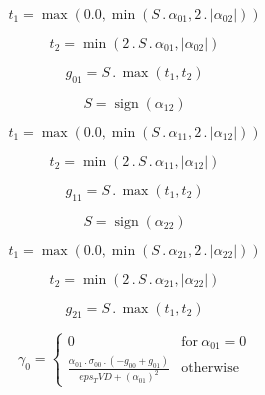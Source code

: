 \documentclass{article}
\begin{document}
\begin{dmath}t_{1} = \max\left(0.0, \min\left(S \,.\, \alpha_{01}, 2 \,.\, \left|{\alpha_{02}}\right|\right)\right)\end{dmath}

\begin{dmath}t_{2} = \min\left(2 \,.\, S \,.\, \alpha_{01}, \left|{\alpha_{02}}\right|\right)\end{dmath}

\begin{dmath}g_{01} = S \,.\, \max\left(t_{1}, t_{2}\right)\end{dmath}

\begin{dmath}S = \operatorname{sign}{\left (\alpha_{12} \right )}\end{dmath}

\begin{dmath}t_{1} = \max\left(0.0, \min\left(S \,.\, \alpha_{11}, 2 \,.\, \left|{\alpha_{12}}\right|\right)\right)\end{dmath}

\begin{dmath}t_{2} = \min\left(2 \,.\, S \,.\, \alpha_{11}, \left|{\alpha_{12}}\right|\right)\end{dmath}

\begin{dmath}g_{11} = S \,.\, \max\left(t_{1}, t_{2}\right)\end{dmath}

\begin{dmath}S = \operatorname{sign}{\left (\alpha_{22} \right )}\end{dmath}

\begin{dmath}t_{1} = \max\left(0.0, \min\left(S \,.\, \alpha_{21}, 2 \,.\, \left|{\alpha_{22}}\right|\right)\right)\end{dmath}

\begin{dmath}t_{2} = \min\left(2 \,.\, S \,.\, \alpha_{21}, \left|{\alpha_{22}}\right|\right)\end{dmath}

\begin{dmath}g_{21} = S \,.\, \max\left(t_{1}, t_{2}\right)\end{dmath}

\begin{dmath}\gamma_{0} = \begin{cases} 0 & \text{for}\: \alpha_{01} = 0 \\\frac{\alpha_{01} \,.\, \sigma_{0 0} \,.\, \left(- g_{00} + g_{01}\right)}{eps_TVD + \left(\alpha_{01} \right)^{2}} & \text{otherwise} \end{cases}\end{dmath}
\end{document}

